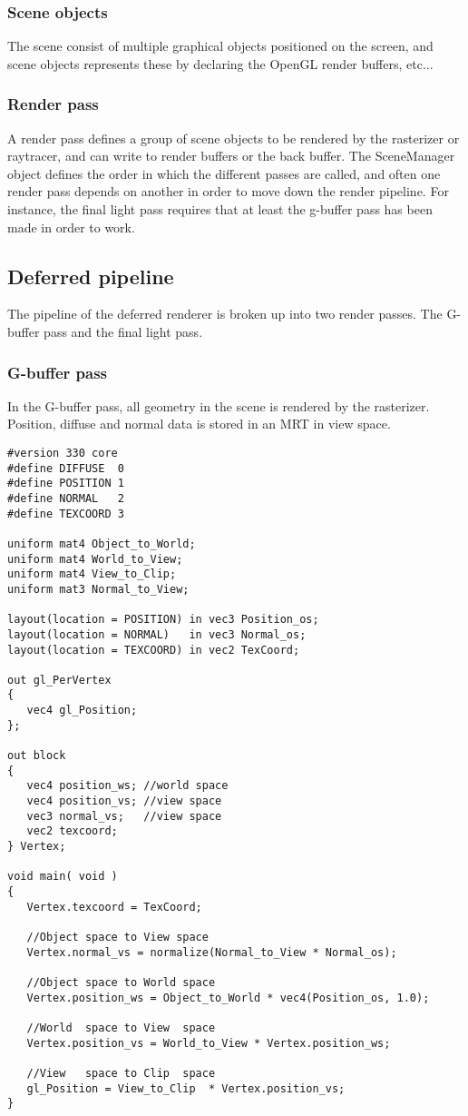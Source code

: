 \subsubsection{Scene objects}
The scene consist of multiple graphical objects positioned on the screen, and scene objects represents these by declaring the OpenGL render buffers, etc...

\subsubsection{Render pass}
A render pass defines a group of scene objects to be rendered by the rasterizer or raytracer, and can write to render buffers or the back buffer. The SceneManager object defines the order in which the different passes are called, and often one render pass depends on another in order to move down the render pipeline. For instance, the final light pass requires that at least the g-buffer pass has been made in order to work.

\subsection{Deferred pipeline}
The pipeline of the deferred renderer is broken up into two render passes. The G-buffer pass and the final light pass.

\subsubsection{G-buffer pass}
In the G-buffer pass, all geometry in the scene is rendered by the rasterizer. Position, diffuse and normal data is stored in an MRT in view space.

\begin{Verbatim}[frame=single, label=G-buffer vertex shader]
#version 330 core
#define DIFFUSE  0
#define POSITION 1
#define NORMAL   2
#define TEXCOORD 3

uniform mat4 Object_to_World;
uniform mat4 World_to_View;
uniform mat4 View_to_Clip;
uniform mat3 Normal_to_View;

layout(location = POSITION) in vec3 Position_os;
layout(location = NORMAL)   in vec3 Normal_os;
layout(location = TEXCOORD) in vec2 TexCoord;

out gl_PerVertex
{
   vec4 gl_Position;
};

out block
{
   vec4 position_ws; //world space
   vec4 position_vs; //view space
   vec3 normal_vs;   //view space
   vec2 texcoord;
} Vertex;

void main( void )
{	
   Vertex.texcoord = TexCoord;
	
   //Object space to View space
   Vertex.normal_vs = normalize(Normal_to_View * Normal_os);
	
   //Object space to World space
   Vertex.position_ws = Object_to_World * vec4(Position_os, 1.0);
	
   //World  space to View  space
   Vertex.position_vs = World_to_View * Vertex.position_ws;
	
   //View   space to Clip  space
   gl_Position = View_to_Clip  * Vertex.position_vs;
}
\end{Verbatim}

